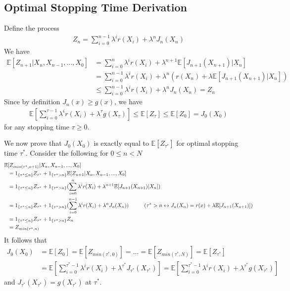 \begin{appendices}
\chapter{Optimal Stopping Time Derivation}\label{thm:ost}
Define the process
\begin{align*}
	Z_n = \sum_{i=0}^{n-1} \lambda^ir(X_i) + \lambda^nJ_n(X_n)
\end{align*}
We have
\begin{align*}
	\mathbb{E}[Z_{n+1} \vert X_n, X_{n-1}, ..., X_0] &= \sum_{i=0}^n \lambda^ir(X_i) + \lambda^{n+1}\mathbb{E}[J_{n+1}(X_{n+1})\vert X_n]\\
	&= \sum_{i=0}^{n-1} \lambda^ir(X_i) + \lambda^n(r(X_n) + \lambda\mathbb{E}[J_{n+1}(X_{n+1})\vert X_n])\\
	&\leq \sum_{i=0}^{n-1} \lambda^i r(X_i) + \lambda^nJ_n(X_n) = Z_n
\end{align*}
Since by definition $J_n(x) \geq g(x)$, we have
\begin{align*}
	\mathbb{E}[\sum_{i=0}^{\tau-1}\lambda^ir(X_i) + \lambda^{\tau}g(X_{\tau})] \leq \mathbb{E}[Z_{\tau}] \leq \mathbb{E}[Z_0] = J_0(X_0)
\end{align*}
for any stopping time $\tau \geq 0$. 

We now prove that $J_0(X_0)$ is exactly equal to $\mathbb{E}[Z_{\tau^*}]$ for optimal stopping time $\tau^*$. Consider the following for $0 \leq n < N$
\begin{align*}
	\mathbb{E}&[Z_{min(\tau^*, n+1)}\vert X_n, X_{n-1}, ..., X_0]\\
	&= 1_{\{\tau^* \leq n\}}Z_{\tau^*} + 1_{\{\tau^* > n\}}\mathbb{E}[Z_{n+1}\vert X_n, X_{n-1}, ..., X_0]\\
	&= 1_{\{\tau^* \leq n\}}Z_{\tau^*} + 1_{\{\tau^* > n\}}(\sum_{i=0}^n \lambda^ir(X_i) + \lambda^{n+1}\mathbb{E}[J_{n+1}(X_{n+1})\vert X_n])\\
	&= 1_{\{\tau^* \leq n\}}Z_{\tau^*} + 1_{\{\tau^* > n\}}(\sum_{i=0}^{n-1} \lambda^ir(X_i) + \lambda^nJ_n(X_n)) \hspace*{1cm} (\tau^* > n\leftrightarrow J_n(X_n) = r(x) + \lambda\mathbb{E}[J_{n+1}(X_{n+1})])\\ 
	&= 1_{\{\tau^* \leq n\}}Z_{\tau^*} + 1_{\{\tau^* > n\}}Z_{n}\\
	&= Z_{min(\tau^*, n)}
\end{align*}
It follows that
\begin{align*}
	J_0(X_0) &= \mathbb{E}[Z_0] = \mathbb{E}[Z_{min(\tau^*, 0)}] = ... = \mathbb{E}[Z_{min(\tau^*, N)}] = \mathbb{E}[Z_{\tau^*}]\\
			 &= \mathbb{E}[\sum_{i=0}^{\tau^* -1}\lambda^ir(X_i) + \lambda^{\tau^*}J_{\tau^*}(X_{\tau^*})] = \mathbb{E}[\sum_{i=0}^{\tau^* -1}\lambda^ir(X_i) + \lambda^{\tau^*}g(X_{\tau^*})]
\end{align*}
and $J_{\tau^*}(X_{\tau^*}) = g(X_{\tau^*})$ at $\tau^*$.


\end{appendices}
